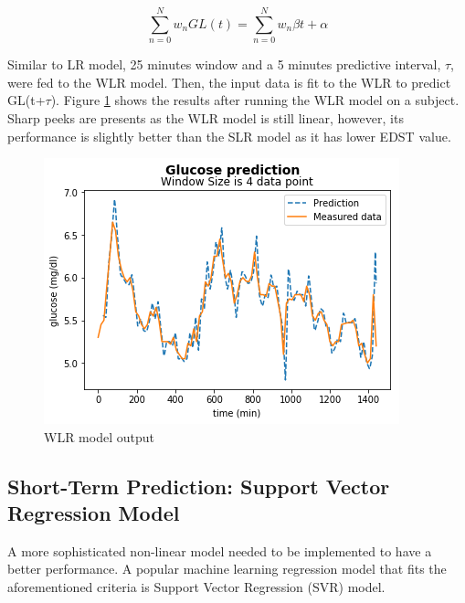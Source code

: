 \begin{equation}
\sum_{n=0}^{N}{w_n GL(t)} =\sum_{n=0}^{N}{w_n\beta t + \alpha} 
\label{wlr-eq}
\end{equation}

Similar to LR model, 25 minutes window and a 5 minutes predictive interval, \ensuremath{\tau}, were fed to the WLR model. Then, the input data is fit to the WLR to predict GL(t+\ensuremath{\tau}). Figure \ref{wlr-fig} shows the results after running the WLR model on a subject. Sharp peeks are presents as the WLR model is still linear, however, its performance is slightly better than the SLR model as it has lower EDST value. 


\begin{center}
\begin{figure}[ht!]
	\centering
    \includegraphics[width=\textwidth]{Figures/mo/wlr.png}
 	\caption{WLR model output}
  	\label{wlr-fig}
\end{figure}
\end{center}

\subsection{Short-Term Prediction: Support Vector Regression Model}
A more sophisticated non-linear model needed to be implemented to have a better performance. A popular machine learning regression model that fits the aforementioned criteria is Support Vector Regression (SVR) model. 

